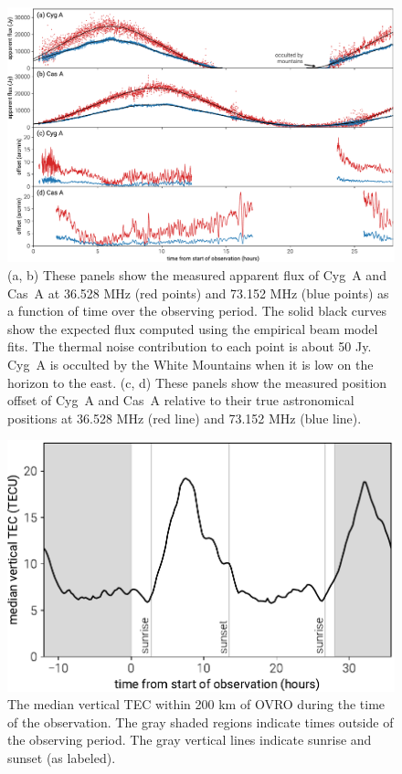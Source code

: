 \documentclass[twocolumn]{aastex61}
\begin{document}
\begin{figure}[t]
    \includegraphics[width=\textwidth]{figures/scintillation-refraction/scintillation-refraction}
    \caption{
        (a, b) These panels show the measured apparent flux of Cyg~A and Cas~A at 36.528 MHz (red
        points) and 73.152 MHz (blue points) as a function of time over the observing period. The
        solid black curves show the expected flux computed using the empirical beam model fits. The
        thermal noise contribution to each point is about 50 Jy.  Cyg~A is occulted by the White
        Mountains when it is low on the horizon to the east.
        (c, d) These panels show the measured position offset of Cyg~A and Cas~A relative to their
        true astronomical positions at 36.528 MHz (red line) and 73.152 MHz (blue line).
    }
    \label{fig:scintillation}
\end{figure}

\begin{figure}[t]
    \includegraphics[width=\columnwidth]{figures/vtec/vtec}
    \caption{
        The median vertical TEC within 200 km of OVRO during the time of the observation. The gray
        shaded regions indicate times outside of the observing period. The gray vertical lines
        indicate sunrise and sunset (as labeled).
    }
    \label{fig:vtec}
\end{figure}
\end{document}
